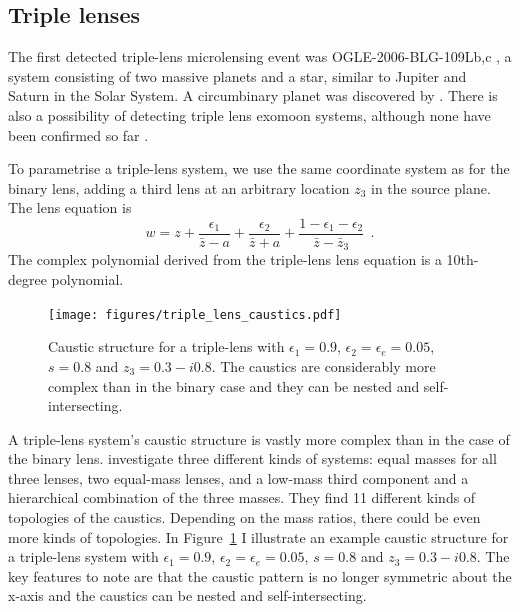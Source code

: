 \documentclass[12pt,dvipsnames]{report}
\newcommand{\hquad}{~~}
\begin{document}
\subsection{Triple lenses}
The first detected triple-lens microlensing event was OGLE-2006-BLG-109Lb,c
\citep{2008Sci...319..927G,2010ApJ...713..837B}, a system consisting of two
massive planets and a star, similar to Jupiter and Saturn in the Solar System.
A circumbinary planet was discovered by \citep{2016AJ....152..125B}.
There is also a possibility of detecting triple lens exomoon systems, although none have been
confirmed so far \citep{2010A&A...520A..68L}.  

To parametrise a triple-lens
system, we use the same coordinate system as for the binary lens, adding 
a third lens at an arbitrary location $z_3$ in the source plane.
The lens equation is 
\begin{equation}
    w=z+\frac{\epsilon_{1}}{\bar{z} - a}+\frac{\epsilon_{2}}{\bar{z} + a} +
    \frac{1 - \epsilon_1 - \epsilon_2}{\bar{z} - \bar{z}_3}
    \hquad.
\end{equation}
The complex polynomial derived from the triple-lens lens equation is a 10th-degree
polynomial.

\begin{figure}[t]
    \centering
    \texttt{[image: figures/triple\_lens\_caustics.pdf]}
    \caption{Caustic structure for a triple-lens with
        $\epsilon_1=0.9$, $\epsilon_2=\epsilon_e=0.05$, $s=0.8$ and $z_3=0.3-i0.8$.
        The caustics are considerably more complex than in the binary case and they
        can be nested and self-intersecting.
    }
    \label{fig:triple_lens_caustics}
\end{figure}
A triple-lens system's caustic structure is vastly more
complex than in the case of the binary lens. \citet{2019ApJ...880...72D} investigate
three different kinds of systems: equal masses for all three lenses, two equal-mass
lenses, and a low-mass third component and a hierarchical combination of
the three masses. They find 11 different kinds of topologies of the caustics.
Depending on the mass ratios, there could be even more kinds of topologies. In
Figure~\ref{fig:triple_lens_caustics} I illustrate an example caustic
structure for a triple-lens system with $\epsilon_1=0.9$,
$\epsilon_2=\epsilon_e=0.05$, $s=0.8$ and $z_3=0.3-i0.8$. The key features to
note are that the caustic pattern is no longer symmetric about the x-axis and
the caustics can be nested and self-intersecting.
\end{document}
